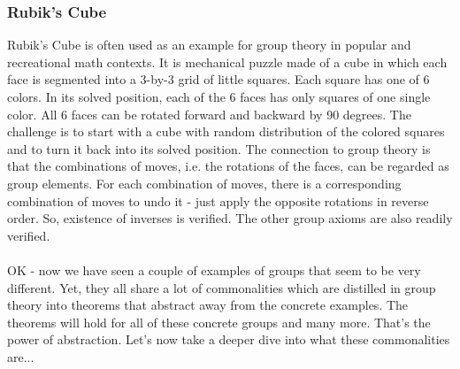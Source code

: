 

\subsubsection{Rubik's Cube} Rubik's Cube is often used as an example for group theory in popular and recreational math contexts. It is mechanical puzzle made of a cube in which each face is segmented into a 3-by-3 grid of little squares. Each square has one of 6 colors. In its solved position, each of the 6 faces has only squares of one single color. All 6 faces can be rotated forward and backward by 90 degrees. The challenge is to start with a cube with random distribution of the colored squares and to turn it back into its solved position. The connection to group theory is that the combinations of moves, i.e. the rotations of the faces, can be regarded as group elements. For each combination of moves, there is a corresponding combination of moves to undo it - just apply the opposite rotations in reverse order. So, existence of inverses is verified. The other group axioms are also readily verified.




\paragraph{}
OK - now we have seen a couple of examples of groups that seem to be very different. Yet, they all share a lot of commonalities which are distilled in group theory into theorems that abstract away from the concrete examples. The theorems will hold for all of these concrete groups and many more. That's the power of abstraction. Let's now take a deeper dive into what these commonalities are...

